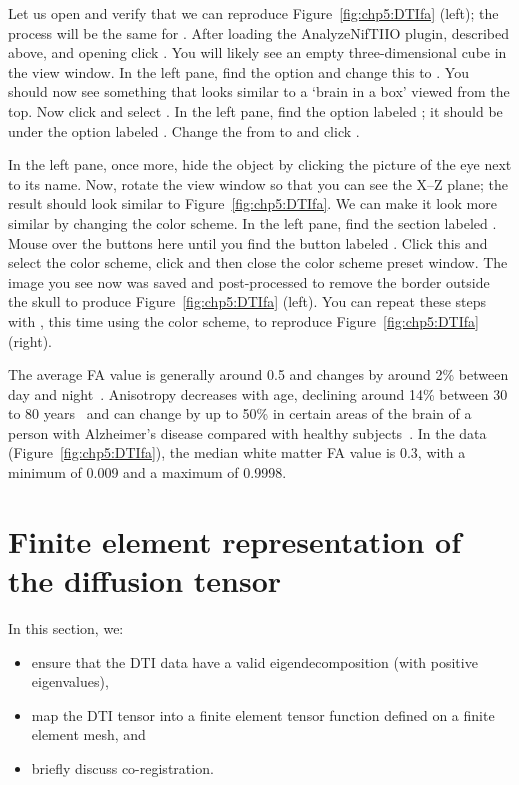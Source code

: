 \noindent Let us open  and verify that we can reproduce 
Figure~\ref{fig:chp5:DTIfa} (left); the process will be the same for 
. After loading the AnalyzeNifTIIO plugin, described above, 
and opening  click . You will likely see an 
empty three-dimensional cube in the view window. In the left pane, 
find the  option and change this to . You 
should now see something that looks similar to a `brain in a box' viewed from 
the top. Now click  and select 
. In the left pane, find the option labeled ; it 
should be under the option labeled . Change the  
from  to  and click . 

In the left pane, once more, hide the object  by clicking the 
picture of the eye next to its name. Now, rotate the view window so that you 
can see the X--Z plane; the result should look similar to 
Figure~\ref{fig:chp5:DTIfa}. We can make it look more similar by changing the 
color scheme. In the left pane, find the section labeled . Mouse 
over the buttons here until you find the button labeled . 
Click this and select the  color scheme, 
click  and then close the color scheme preset window. The image 
you see now was saved and post-processed to remove the border outside the 
skull to produce Figure~\ref{fig:chp5:DTIfa} (left). You can repeat these 
steps with , this time using the  color scheme, to 
reproduce Figure~\ref{fig:chp5:DTIfa} (right).

The average FA value is generally around 0.5 and changes by around 2\%
between day and night~\cite{voldsbekk2020evidence}. Anisotropy
decreases with age, declining around 14\% between 30 to 80
years~\cite{kochunov2011fractional} and can change by up to 50\% in
certain areas of the brain of a person with Alzheimer's disease
compared with healthy subjects~\cite{naggara2006diffusion}. In the
 data (Figure~\ref{fig:chp5:DTIfa}), the median white
matter FA value is 0.3, with a minimum of 0.009 and a maximum of
0.9998.

\section{Finite element representation of the diffusion tensor}

In this section, we:
\begin{itemize}
\item
  ensure that the DTI data have a valid eigendecomposition (with positive eigenvalues),
\item
  map the DTI tensor into a finite element tensor function defined on
  a finite element mesh, and
\item
  briefly discuss co-registration.
\end{itemize}

